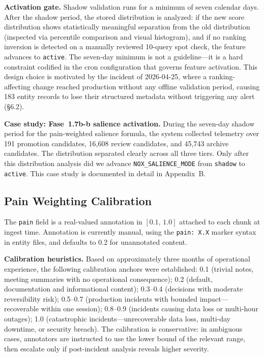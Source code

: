 \textbf{Activation gate.} Shadow validation runs for a minimum of seven calendar days.
After the shadow period, the stored distribution is analyzed: if the new score distribution
shows statistically meaningful separation from the old distribution (inspected via
percentile comparison and visual histogram), and if no ranking inversion is detected on a
manually reviewed 10-query spot check, the feature advances to \texttt{active}. The
seven-day minimum is not a guideline---it is a hard constraint codified in the cron
configuration that governs feature activation. This design choice is motivated by the
incident of 2026-04-25, where a ranking-affecting change reached production without any
offline validation period, causing 183 entity records to lose their structured metadata
without triggering any alert (\S6.2).

\textbf{Case study: Fase~1.7b-b salience activation.} During the seven-day shadow period
for the pain-weighted salience formula, the system collected telemetry over 191 promotion
candidates, 16,608 review candidates, and 45,743 archive candidates. The distribution
separated clearly across all three tiers. Only after this distribution analysis did we
advance \texttt{NOX\_SALIENCE\_MODE} from \texttt{shadow} to \texttt{active}. This case
study is documented in detail in Appendix~B.

\subsection{Pain Weighting Calibration}

The \texttt{pain} field is a real-valued annotation in $[0.1,\,1.0]$ attached to each
chunk at ingest time. Annotation is currently manual, using the \texttt{pain: X.X} marker
syntax in entity files, and defaults to 0.2 for unannotated content.

\textbf{Calibration heuristics.} Based on approximately three months of operational experience, the
following calibration anchors were established: 0.1 (trivial notes, meeting summaries with
no operational consequence); 0.2 (default, documentation and informational content);
0.3--0.4 (decisions with moderate reversibility risk); 0.5--0.7 (production incidents with
bounded impact---recoverable within one session); 0.8--0.9 (incidents causing data loss or
multi-hour outages); 1.0 (catastrophic incidents---unrecoverable data loss, multi-day
downtime, or security breach). The calibration is conservative: in ambiguous cases,
annotators are instructed to use the lower bound of the relevant range, then escalate only
if post-incident analysis reveals higher severity.


